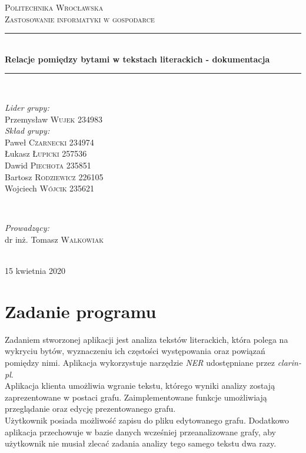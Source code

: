 \documentclass[12pt,a4paper]{article} %
\begin{document}
\begin{titlepage}

\newcommand{\HRule}{\rule{\linewidth}{0.5mm}}

\center
 
\textsc{\LARGE Politechnika Wrocławska}\\[1.5cm] 
\textsc{\Large Zastosowanie informatyki w gospodarce}\\[0.5cm]

\HRule \\[0.5cm]
{ \huge \bfseries Relacje pomiędzy bytami w tekstach literackich - dokumentacja}\\[0.2cm]
\HRule \\[1.6cm]
 
 
\begin{minipage}{0.4\textwidth}
\begin{flushleft} \large
\emph{Lider grupy:}\\
Przemysław \textsc{Wujek} 234983\\
\emph{Skład grupy:}\\
Paweł \textsc{Czarnecki} 234974\\
Łukasz \textsc{Łupicki} 257536\\
Dawid \textsc{Piechota} 235851\\
Bartosz \textsc{Rodziewicz} 226105\\
Wojciech \textsc{Wójcik} 235621\\
\end{flushleft}
\end{minipage}
~
\begin{minipage}{0.4\textwidth}
\begin{flushright} \large
\emph{Prowadzący:} \\
dr inż. Tomasz \textsc{Walkowiak} 
\end{flushright}
\end{minipage}\\[4cm]

\vfill
{\large 15 kwietnia 2020}

\end{titlepage}
   
\newpage
\tableofcontents 

\newpage

\section{Zadanie programu}
    Zadaniem stworzonej aplikacji jest analiza tekstów literackich, która polega na wykryciu bytów, wyznaczeniu ich częstości występowania oraz powiązań pomiędzy nimi. Aplikacja wykorzystuje narzędzie \textit{NER} udostępniane przez \textit{clarin-pl}.\\
    Aplikacja klienta umożliwia wgranie tekstu, którego wyniki analizy zostają zaprezentowane w postaci grafu. Zaimplementowane funkcje umożliwiają przeglądanie oraz edycję prezentowanego grafu.\\
    Użytkownik posiada możliwość zapisu do pliku edytowanego grafu. Dodatkowo aplikacja przechowuje w bazie danych wcześniej przeanalizowane grafy, aby użytkownik nie musiał zlecać zadania analizy tego samego tekstu dwa razy.
\end{document}

